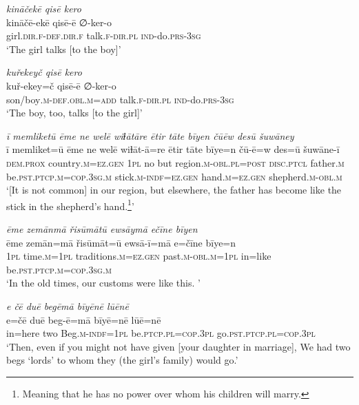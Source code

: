 \ea \label{RE.31}
\textit{kināčekē qisē kero} \\ 
\gll kināčē-ekē qisē-ē ∅-ker-o \\ 
 girl\textsc{.dir}\textsc{.f}\textsc{-def}\textsc{.dir}\textsc{.f} talk\textsc{.f}\textsc{-dir}\textsc{.pl} \textsc{ind-}do\textsc{.prs}\textsc{-3sg} \\ 
\glt `The girl talks [to the boy]'
\z 
 
\ea \label{RE.32}
\textit{kuřekeyč qisē kero} \\ 
\gll kuř-ekey=č qisē-ē ∅-ker-o \\ 
 son/boy\textsc{.m}\textsc{-def}\textsc{.obl}\textsc{.m}\textsc{=add} talk\textsc{.f}\textsc{-dir}\textsc{.pl} \textsc{ind-}do\textsc{.prs}\textsc{-3sg} \\ 
\glt `The boy, too, talks [to the girl]'
\z 
 
\ea \label{RE.41}
\textit{ī memliketū ēme ne welē wiɫātāre ētir tāte bīyen čūēw desū šuwāney} \\ 
\gll ī memliket=ū ēme ne welē wiɫāt-ā=re ētir tāte bīye=n čū-ē=w des=ū šuwāne-ī \\ 
 \textsc{dem.prox} country\textsc{.m}\textsc{=ez.gen} \textsc{1pl} no but region\textsc{.m}\textsc{-obl}\textsc{.pl}\textsc{=\textsc{post}} \textsc{disc.ptcl} father\textsc{.m} be\textsc{.pst}\textsc{.ptcp}\textsc{.m}\textsc{=cop}\textsc{.3sg}\textsc{.m} stick\textsc{.m}\textsc{-indf}\textsc{=ez.gen} hand\textsc{.m}\textsc{=ez.gen} shepherd\textsc{.m}\textsc{-obl}\textsc{.m} \\ 
\glt `[It is not common] in our region, but elsewhere, the father has become like the stick in the shepherd’s hand.\footnote{Meaning that he has no power over whom his children will marry.}'
\z 
 
\ea \label{RE.42}
\textit{ēme zemānmā řisūmātū ewsāymā ečīne bīyen} \\ 
\gll ēme zemān=mā řisūmāt=ū ewsā-ī=mā e=čīne bīye=n \\ 
 \textsc{1pl} time\textsc{.m}\textsc{=\textsc{1pl}} traditions\textsc{.m}\textsc{=ez.gen} past\textsc{.m}\textsc{-obl}\textsc{.m}\textsc{=\textsc{1pl}} in=like be\textsc{.pst}\textsc{.ptcp}\textsc{.m}\textsc{=cop}\textsc{.3sg}\textsc{.m} \\ 
\glt `In the old times, our customs were like this. '
\z 
 
\ea \label{RE.43}
\textit{e čē duē begēmā bīyēnē lūēnē} \\ 
\gll e=čē duē beg-ē=mā bīyē=nē lūē=nē \\ 
 in=here two Beg\textsc{.m}\textsc{-indf}\textsc{=\textsc{1pl}} be\textsc{.ptcp}\textsc{.pl}\textsc{=cop}\textsc{.3pl} go\textsc{.pst}\textsc{.ptcp}\textsc{.pl}\textsc{=cop}\textsc{.3pl} \\ 
\glt `Then, even if you might not have given [your daughter in marriage], We had two begs ‘lords’ to whom they (the girl's family) would go.'
\z 
 

